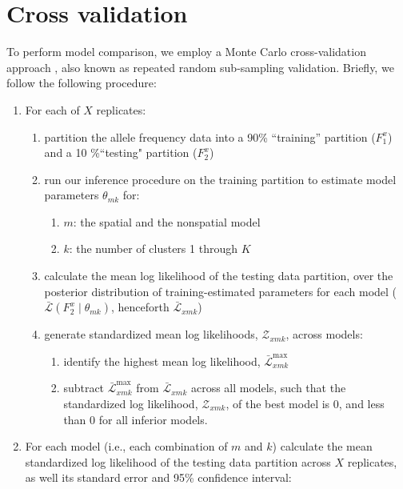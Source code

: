 \documentclass[12pt]{article}
\begin{document}
\newpage
\section{Cross validation}\label{Xvalidation}
To perform model comparison, we employ a Monte Carlo cross-validation approach \citep{picard1984},
also known as repeated random sub-sampling validation.
Briefly, we follow the following procedure:
\begin{enumerate}
\item For each of $X$ replicates:
	\begin{enumerate}
		\item partition the allele frequency data into a 90\% ``training'' partition ($F^x_1$) and a 10 \%``testing" partition ($F^x_2$) \label{partition}
		\item run our inference procedure on the training partition to estimate model parameters $\theta_{mk}$ for: \label{inference}
			\begin{enumerate}
				\item $m$: the spatial and the nonspatial model
				\item $k$: the number of clusters 1 through $K$
			\end{enumerate}	
	\item calculate the mean log likelihood of the testing data partition, 
	over the posterior distribution of training-estimated parameters for each model 
	($\bar{\mathcal{L}}(F^x_2 \mid \theta_{mk})$, henceforth $\bar{\mathcal{L}}_{xmk}$) \label{lnL}
	\item generate standardized mean log likelihoods, $\mathcal{Z}_{xmk}$, across models: \label{standardize}
		\begin{enumerate}
			\item identify the highest mean log likelihood, $\bar{\mathcal{L}}^\text{max}_{xmk}$
			\item subtract $\bar{\mathcal{L}}^\text{max}_{xmk}$ from $\bar{\mathcal{L}}_{xmk}$ across all models,
				such that the standardized log likelihood, $\mathcal{Z}_{xmk}$, of the best model is 0,
				and less than 0 for all inferior models. 
		\end{enumerate}
	\end{enumerate}
\item For each model (i.e., each combination of $m$ and $k$) calculate 
	the mean standardized log likelihood of the testing data partition across $X$ replicates, 
	as well its standard error and 95\% confidence interval:
	\begin{enumerate}

\end{enumerate}
\end{enumerate}
\end{document}
